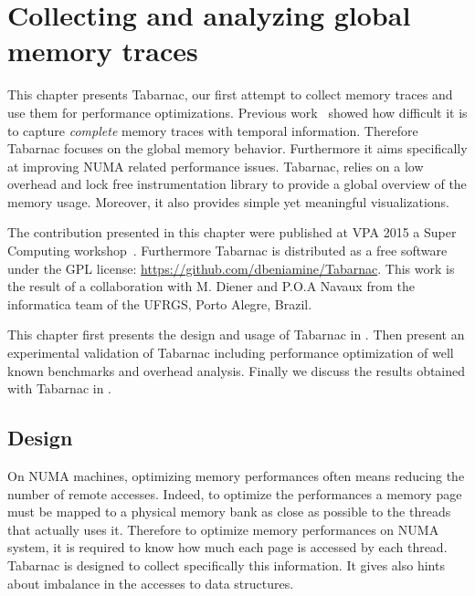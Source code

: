 \chapter{Collecting and analyzing global memory traces}
\label{chap:tabarnac}

This chapter presents \gls{Tabarnac}, our first attempt to collect memory traces and use them for performance optimizations.
Previous work~\cite{Beniamine13Cartographier} showed how difficult it is to capture \emph{complete} memory traces with temporal information.
Therefore \gls{Tabarnac} focuses on the global memory behavior.
Furthermore it aims specifically at improving \gls{NUMA} related performance issues.
\gls{Tabarnac}, relies on a low overhead and lock free instrumentation library to provide a global overview of the memory usage.
Moreover,  it also provides simple yet meaningful visualizations.

The contribution presented in this chapter were published at \gls{VPA} 2015 a Super Computing workshop~\cite{Beniamine15TABARNAC}.
Furthermore \gls{Tabarnac} is distributed as a free software under the \gls{GPL} license: \url{https://github.com/dbeniamine/Tabarnac}.
This work is the result of a collaboration with M. Diener and P.O.A Navaux from the informatica team of the \gls{UFRGS}, Porto Alegre, Brazil.

This chapter first presents the design and usage of \gls{Tabarnac} in .
Then  present an experimental validation of \gls{Tabarnac} including performance optimization of well known benchmarks and overhead analysis.
Finally we discuss the results obtained with \gls{Tabarnac} in .

\section{Design}
\label{sec:tab-design}

On \gls{NUMA} machines, optimizing memory performances often means reducing the number of remote accesses.
Indeed, to optimize the performances a memory page must be mapped to a physical memory bank as close as possible to the threads that actually uses it.
Therefore to optimize memory performances on \gls{NUMA} system, it is required to know how much each page is accessed by each thread.
\gls{Tabarnac} is designed to collect specifically this information.
It gives also hints about imbalance in the accesses to data structures.

